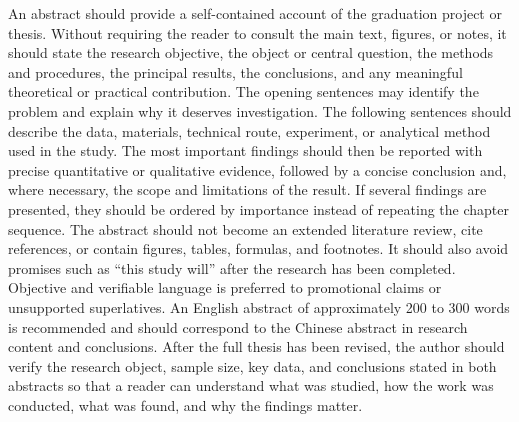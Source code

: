 \documentclass{swutthesis}
\begin{document}
\begin{enabstract}
An abstract should provide a self-contained account of the graduation project
or thesis. Without requiring the reader to consult the main text, figures, or
notes, it should state the research objective, the object or central question,
the methods and procedures, the principal results, the conclusions, and any
meaningful theoretical or practical contribution. The opening sentences may
identify the problem and explain why it deserves investigation. The following
sentences should describe the data, materials, technical route, experiment, or
analytical method used in the study. The most important findings should then
be reported with precise quantitative or qualitative evidence, followed by a
concise conclusion and, where necessary, the scope and limitations of the
result. If several findings are presented, they should be ordered by
importance instead of repeating the chapter sequence. The abstract should not
become an extended literature review, cite references, or contain figures,
tables, formulas, and footnotes. It should also avoid promises such as “this
study will” after the research has been completed. Objective and verifiable
language is preferred to promotional claims or unsupported superlatives. An
English abstract of approximately 200 to 300 words is recommended and should
correspond to the Chinese abstract in research content and conclusions. After
the full thesis has been revised, the author should verify the research object,
sample size, key data, and conclusions stated in both abstracts so that a
reader can understand what was studied, how the work was conducted, what was
found, and why the findings matter.
\end{enabstract}

\swuttableofcontents
\listoffiguresandtables

\mainmatter






\end{document}
